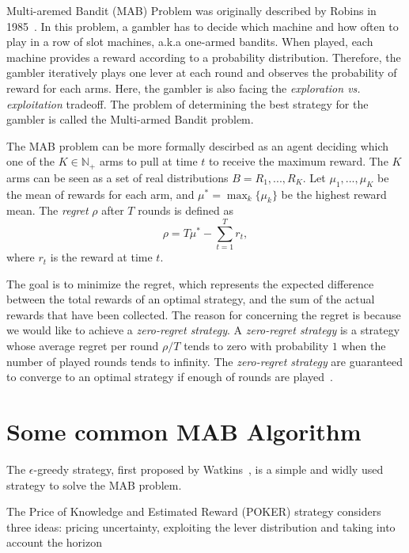 Multi-aremed Bandit (MAB) Problem was originally described by Robins in 1985~\cite{Robbins:1985:MAB}.
In this problem, a gambler has to decide which machine and how often to play in a row of slot machines, a.k.a one-armed bandits. 
When played, each machine provides a reward according to a probability distribution.
Therefore, the gambler iteratively plays one lever at each round and observes the probability of reward for each arms.
Here, the gambler is also facing the \textit{exploration vs. exploitation} tradeoff.
The problem of determining the best strategy for the gambler is called the Multi-armed Bandit problem.


The MAB problem can be more formally descirbed as 
an agent deciding which one of the $K \in \mathbb{N}_+$ arms to pull at time $t$ to receive the maximum reward.
The $K$ arms can be seen as a set of real distributions $B = {R_1, ..., R_K}$.
Let $\mu_1, ..., \mu_K$ be the mean of rewards for each arm, and $\mu^* = \max_{k} \{ \mu_k \}$ be the highest reward mean.
The \textit{regret} $\rho$ after $T$ rounds is defined as
\begin{displaymath}
\rho = T\mu^* - \sum_{t=1}^{T} r_t,
\end{displaymath}
where $r_t$ is the reward at time $t$.

The goal is to minimize the regret, which represents the expected difference between the total rewards of an optimal strategy,
and the sum of the actual rewards that have been collected.  
The reason for concerning the regret is because we would like to achieve a \textit{zero-regret strategy}.
A \textit{zero-regret strategy} is a strategy whose average regret per round $\rho / T$ tends to zero with probability $1$ 
when the number of played rounds tends to infinity.
The \textit{zero-regret strategy} are guaranteed to converge to an optimal strategy if enough of rounds are played~\cite{Vermorel:2005:MAB}.



\section{Some common MAB Algorithm}

The $\epsilon$-greedy strategy, first proposed by Watkins~\cite{Watkins:1989:eta}, is a simple and widly used strategy to solve the MAB problem.

The Price of Knowledge and Estimated Reward (POKER) strategy considers three ideas: pricing uncertainty, exploiting the lever distribution and taking into account the horizon



